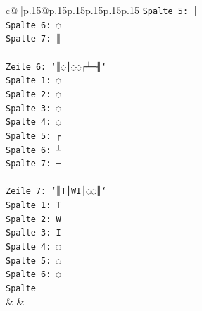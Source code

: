 \documentclass{article}
\begin{document}
{\begin{supertabular}{c@{$\;$}|p{.15\linewidth}@{}p{.15\linewidth}p{.15\linewidth}p{.15\linewidth}p{.15\linewidth}p{.15\linewidth}}
{{{\texttt{Spalte 5: │} \\
\texttt{Spalte 6: ◌} \\
\texttt{Spalte 7: ║} \\
\\ 
\texttt{Zeile 6: `║◌│◌◌┌┴─╢`} \\
\texttt{Spalte 1: ◌} \\
\texttt{Spalte 2: ◌} \\
\texttt{Spalte 3: ◌} \\
\texttt{Spalte 4: ◌} \\
\texttt{Spalte 5: ┌} \\
\texttt{Spalte 6: ┴} \\
\texttt{Spalte 7: ─} \\
\\ 
\texttt{Zeile 7: `║T│WI│◌◌║`} \\
\texttt{Spalte 1: T} \\
\texttt{Spalte 2: W} \\
\texttt{Spalte 3: I} \\
\texttt{Spalte 4: ◌} \\
\texttt{Spalte 5: ◌} \\
\texttt{Spalte 6: ◌} \\
\texttt{Spalte} \\
            }
        }
    }
    & & \\ \\


\end{supertabular}}
\end{document}
